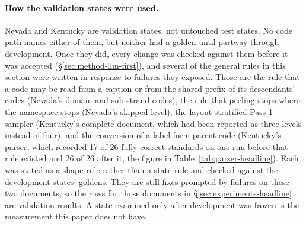 \paragraph{How the validation states were used.}
\label{sec:method-validation-use}
Nevada and Kentucky are validation states, not untouched test states. No code
path names either of them, but neither had a golden until partway through
development. Once they did, every change was checked against them before it was
accepted (\S\ref{sec:method-llm-first}), and several of the general rules in
this section were written in response to failures they exposed. Those are the
rule that a code may be read from a caption or from the shared prefix of its
descendants' codes (Nevada's domain and sub-strand codes), the rule that peeling
stops where the namespace stops (Nevada's skipped level), the layout-stratified
Pass-1 sampler (Kentucky's complete document, which had been reported as three
levels instead of four), and the conversion of a label-form parent code
(Kentucky's parser, which recorded 17 of 26 fully correct standards on one run
  before that rule existed and 26 of 26 after it, the figure in
Table~\ref{tab:parser-headline}). Each was stated as a shape rule rather than a
state rule and checked against the development states' goldens. They are still
fixes prompted by failures on these two documents, so the rows for those
documents in \S\ref{sec:experiments-headline} are validation results. A state
examined only after development was frozen is the measurement this paper does
not have.
